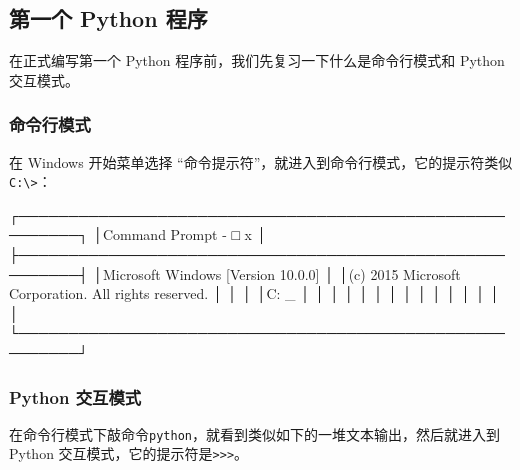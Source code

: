 \hypertarget{ux7b2cux4e00ux4e2a-python-ux7a0bux5e8f}{%
\subsection{第一个 Python
程序}\label{ux7b2cux4e00ux4e2a-python-ux7a0bux5e8f}}

在正式编写第一个 Python 程序前，我们先复习一下什么是命令行模式和 Python
交互模式。

\hypertarget{ux547dux4ee4ux884cux6a21ux5f0f}{%
\subsubsection{命令行模式}\label{ux547dux4ee4ux884cux6a21ux5f0f}}

在 Windows 开始菜单选择
``命令提示符''，就进入到命令行模式，它的提示符类似\texttt{C:\textbackslash{}\textgreater{}}：

\begin{pythoncode}
┌────────────────────────────────────────────────────────┐
│Command Prompt                                    - □ x │
├────────────────────────────────────────────────────────┤
│Microsoft Windows [Version 10.0.0]                      │
│(c) 2015 Microsoft Corporation. All rights reserved.    │
│                                                        │
│C:\> _                                                  │
│                                                        │
│                                                        │
│                                                        │
│                                                        │
│                                                        │
│                                                        │
│                                                        │
└────────────────────────────────────────────────────────┘
\end{pythoncode}

\hypertarget{python-ux4ea4ux4e92ux6a21ux5f0f}{%
\subsubsection{Python 交互模式}\label{python-ux4ea4ux4e92ux6a21ux5f0f}}

在命令行模式下敲命令\texttt{python}，就看到类似如下的一堆文本输出，然后就进入到
Python
交互模式，它的提示符是\texttt{\textgreater{}\textgreater{}\textgreater{}}。

